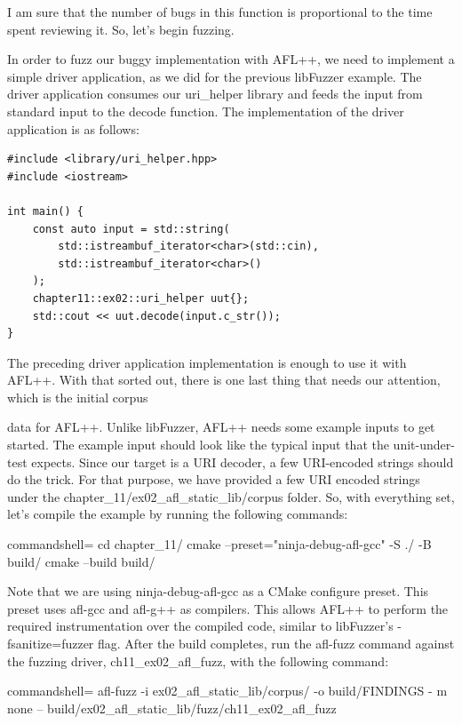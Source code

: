 I am sure that the number of bugs in this function is proportional to the time spent reviewing it. So, let's begin fuzzing.

In order to fuzz our buggy implementation with AFL++, we need to implement a simple driver application, as we did for the previous libFuzzer example. The driver application consumes our uri\_helper library and feeds the input from standard input to the decode function. The implementation of the driver application is as follows:

\begin{lstlisting}[style=styleCXX]
#include <library/uri_helper.hpp>
#include <iostream>

int main() {
	const auto input = std::string(
		std::istreambuf_iterator<char>(std::cin),
		std::istreambuf_iterator<char>()
	);
	chapter11::ex02::uri_helper uut{};
	std::cout << uut.decode(input.c_str());
}
\end{lstlisting}

The preceding driver application implementation is enough to use it with AFL++. With that sorted out, there is one last thing that needs our attention, which is the initial corpus

data for AFL++. Unlike libFuzzer, AFL++ needs some example inputs to get started. The example input should look like the typical input that the unit-under-test expects. Since our target is a URI decoder, a few URI-encoded strings should do the trick. For that purpose, we have provided a few URI encoded strings under the chapter\_11/ex02\_afl\_static\_lib/corpus folder. So, with everything set, let's compile the example by running the following commands:

\begin{tcblisting}{commandshell={}}
cd chapter_11/
cmake --preset="ninja-debug-afl-gcc" -S ./ -B build/
cmake --build build/
\end{tcblisting}

Note that we are using ninja-debug-afl-gcc as a CMake configure preset. This preset uses afl-gcc and afl-g++ as compilers. This allows AFL++ to perform the required instrumentation over the compiled code, similar to libFuzzer's -fsanitize=fuzzer flag. After the build completes, run the afl-fuzz command against the fuzzing driver, ch11\_ex02\_afl\_fuzz, with the following command:

\begin{tcblisting}{commandshell={}}
afl-fuzz -i ex02_afl_static_lib/corpus/ -o build/FINDINGS -
m none -- build/ex02_afl_static_lib/fuzz/ch11_ex02_afl_fuzz
\end{tcblisting}

